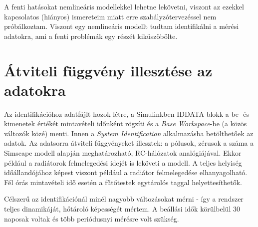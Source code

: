A fenti hatásokat nemlineáris modellekkel lehetne lekövetni, viszont az ezekkel kapcsolatos (hiányos) ismereteim miatt erre szabályzótervezéssel nem próbálkoztam. Viszont egy nemlineáris modellt tudtam identifikálni a mérési adatokra, ami a fenti problémák egy részét kiküszöbölte.


\section{Átviteli függvény illesztése az adatokra}

Az identifikációhoz adatfájlt hozok létre, a Simulinkben IDDATA blokk a be- és kimenetek értékét mintavételi időnként rögzíti és a \textit{Base Workspace}-be (a közös változók közé) menti. Innen a \textit{System Identification} alkalmazásba betölthetőek az adatok. %
Az adatsorra átviteli függvényeket illesztek: a pólusok, zérusok a száma a Simscape modell alapján meghatározható, RC-hálózatok analógiájával. Ekkor például a radiátorok felmelegedési idejét is leköveti a modell. A teljes helyiség időállandójához képest viszont például a radiátor felmelegedése elhanyagolható. Fél órás mintavételi idő esetén a fűtőtestek egytárolós taggal helyettesíthetők. 




Célszerű az identifikációnál minél nagyobb változásokat mérni - így a rendszer teljes dinamikáját, hőtároló képességét mértem. A beállási idők körülbelül 30 naposak voltak és több periódusnyi mérésre volt szükség. 



